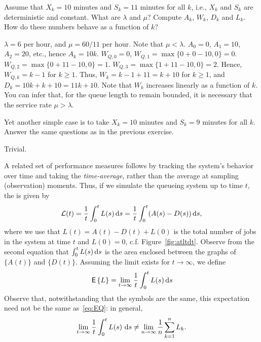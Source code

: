 \begin{exercise}\label{ex:2}
 Assume that $X_k = 10$ minutes and $S_k = 11$ minutes for all
    $k$, i.e., $X_k$ and $S_k$ are deterministic and constant. What
    are $\lambda$ and $\mu$?  Compute $A_k$, $W_k$, $D_k$ and
    $L_k$. How do these numbers behave as a function of $k$?
  \begin{solution}
 $\lambda=6$ per hour, and $\mu=60/11$ per hour. Note that
      $\mu < \lambda$. $A_0 = 0$, $A_1=10$, $A_2=20$, etc., hence
      $A_k = 10k$. $W_{Q,0} = 0$, $W_{Q,1} = \max\{0 + 0-10,0\} = 0$.
      $W_{Q,2} = \max\{0+11-10,0\} =1$.
      $W_{Q,3} = \max\{1+11-10,0\} =2$. Hence, $W_{Q,k} = k-1$ for
      $k\geq1$. Thus, $W_k = k-1+11 = k + 10$ for $k\geq1$, and
      $D_k = 10k + k+10 = 11k+10$. Note that $W_k$ increases linearly
      as a function of $k$.  You can infer that, for the queue length
      to remain bounded, it is necessary that the service rate
      $\mu > \lambda$.
  \end{solution}
\end{exercise}


\begin{exercise}
 Yet another simple case is to take $X_k=10$ minutes and
    $S_k=9$ minutes for all $k$. Answer the same questions as in the
    previous exercise.
  \begin{solution}
 Trivial.
  \end{solution}
\end{exercise}


A related set of performance measures follows by tracking the system's
behavior over time and taking the \emph{time-average}, rather than the
average at sampling (observation) moments. Thus, if we simulate the
queueing system up to time $t$, the  is given by
\begin{equation}\label{eq:11}
\mathcal{L}(t) = \frac 1 t\int_0^t L(s)\,\text{d}s =  \frac 1 t\int_0^t (A(s)-D(s)) \,\text{d}s,
\end{equation}
where we use that $L(t)=A(t) - D(t) + L(0)$ is the total number of jobs in
the system at time $t$ and $L(0)=0$, c.f. Figure~\ref{fig:atltdt}.  Observe from the second equation that $\int_0^t L(s)\,\text{d}s$ is the area enclosed between the graphs of $\{A(t)\}$
and $\{D(t)\}$. Assuming the limit exists for $t\to\infty$, we define
\begin{equation}
  \label{eq:46}
  \,\mathsf{E}\left\{L\right\} = \lim_{t\to\infty} \frac 1 t\int_0^t L(s) \,\text{d}s 
\end{equation}
Observe that, notwithstanding that the symbols are the same, this
expectation need not be the same as~\eqref{eq:EQ}: in general,
\begin{equation*}
  \lim_{t\to\infty} \frac 1 t\int_0^t L(s)\, \,\text{d}s \neq   \lim_{n\to\infty}\frac 1n  \sum_{k=1}^n L_k.
\end{equation*}

